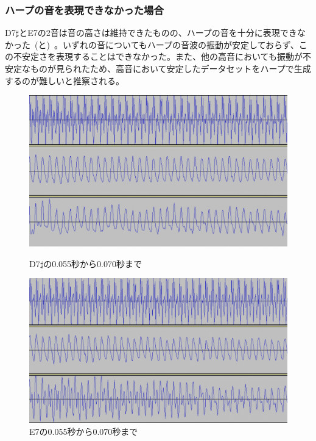 \clearpage

\subsubsection{ハープの音を表現できなかった場合}

D7$\sharp$とE7の2音は音の高さは維持できたものの、ハープの音を十分に表現できなかった~(と)~。いずれの音についてもハープの音波の振動が安定しておらず、この不安定さを表現することはできなかった。また、他の高音においても振動が不安定なものが見られたため、高音において安定したデータセットをハープで生成するのが難しいと推察される。

\begin{figure}[b]
\centering
\begin{minipage}{0.48\columnwidth}
\centering
\includegraphics[width=0.9\columnwidth]{figure/88_88_det/d7s_0550_0700.png}
\caption[D7$\sharp$の音波]{D7$\sharp$の0.055秒から0.070秒まで}
\label{fig:88_88_bad1}
\end{minipage}
\begin{minipage}{0.48\columnwidth}
\centering
\includegraphics[width=0.9\columnwidth]{figure/88_88_det/e7_0550_0700.png}
\caption[E7の音波]{E7の0.055秒から0.070秒まで}
\label{fig:88_88_bad2}
\end{minipage}
\end{figure}

